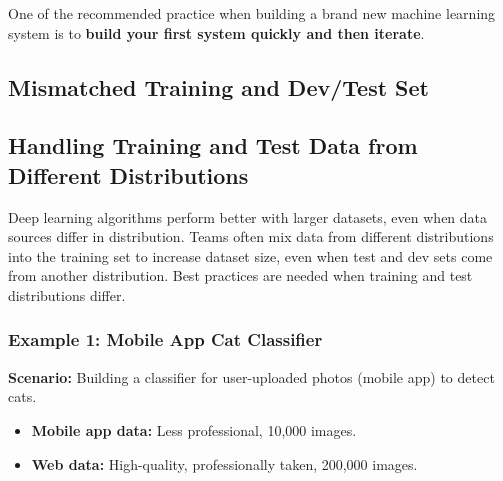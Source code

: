 \documentclass[letterpaper,12pt,notitlepage,twoside]{report}
\begin{document}
One of the recommended practice when building a brand new machine learning system is to \textbf{build your first system quickly and then iterate}.

\subsection{Mismatched Training and Dev/Test Set}

\subsection*{Handling Training and Test Data from Different Distributions}

Deep learning algorithms perform better with larger datasets, even when data sources differ in distribution. Teams often mix data from different distributions into the training set to increase dataset size, even when test and dev sets come from another distribution. Best practices are needed when training and test distributions differ.

\subsubsection*{Example 1: Mobile App Cat Classifier}
\textbf{Scenario:} Building a classifier for user-uploaded photos (mobile app) to detect cats.
\begin{itemize}
    \item \textbf{Mobile app data:} Less professional, 10,000 images.
    \item \textbf{Web data:} High-quality, professionally taken, 200,000 images.
\end{itemize}
\end{document}
